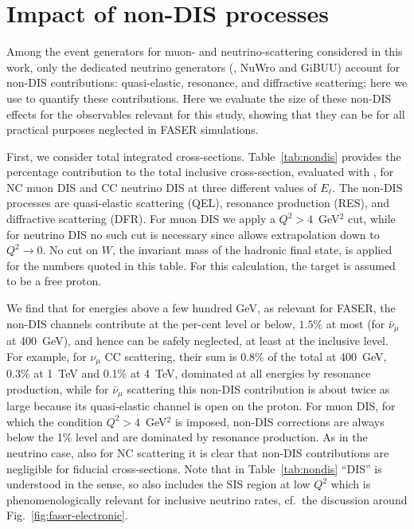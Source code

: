 \section{Impact of non-DIS processes}
\label{app:nondis}

Among the event generators for muon- and neutrino-scattering considered in this work, only the dedicated neutrino generators (\genie, {\sc\small NuWro} and {\sc\small GiBUU}) account for non-DIS contributions: quasi-elastic, resonance, and diffractive scattering; here we use \genie to quantify these contributions.
%
Here we evaluate the size of these non-DIS effects for the observables relevant for this study, showing that they can be for all practical purposes neglected in FASER simulations. 

First, we consider total integrated cross-sections.
%
Table~\ref{tab:nondis} provides the percentage contribution to the total inclusive cross-section, evaluated with \genie, for NC muon DIS and CC neutrino DIS at three different values of $E_\ell$. 
  The non-DIS processes are quasi-elastic scattering (QEL), resonance production (RES), and diffractive scattering (DFR).
%
For muon DIS we apply a $Q^2 > 4$~GeV$^2$ cut, while for neutrino DIS no such cut is necessary since \genie allows extrapolation down to $Q^2\to 0$. 
%
No cut on $W$, the invariant mass of the hadronic final state, is applied for the numbers quoted in this table.
%
For this calculation, the target is assumed to be a free proton. 

We find that for energies above a few hundred GeV, as relevant for FASER, the non-DIS channels contribute at the per-cent level or below, $1.5\%$ at most (for $\bar\nu_\mu$ at 400~GeV), and hence can be safely neglected, at least at the inclusive level.
%
For example, for $\nu_\mu$ CC scattering, their sum is 0.8\% of the total at 400~GeV, 0.3\% at 1~TeV and 0.1\% at 4~TeV, dominated at all energies by resonance production, while for $\bar\nu_\mu$ scattering this non-DIS contribution is about twice as large because its quasi-elastic channel is open on the proton.  
%
For muon DIS, for which the condition $Q^2> 4$~GeV$^2$ is imposed, non-DIS corrections are always below the 1\% level and are dominated by resonance production.
%
As in the neutrino case, also for NC scattering it is clear that non-DIS contributions are negligible for fiducial cross-sections. 
%
Note that in Table~\ref{tab:nondis} ``DIS'' is understood in the \genie sense, so also includes the SIS region at low $Q^2$ which is phenomenologically relevant for inclusive neutrino rates, cf.\ the discussion around Fig.~\ref{fig:faser-electronic}.

